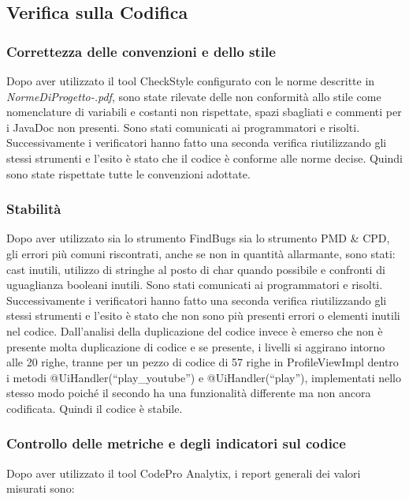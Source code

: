 \subsection{Verifica sulla Codifica}

\subsubsection*{Correttezza delle convenzioni e dello stile}
Dopo aver utilizzato il tool CheckStyle configurato con le norme descritte in
\emph{NormeDiProgetto-\versionenormeprogetto.pdf}, sono state rilevate delle non
conformit\`a allo stile come nomenclature di variabili e costanti non
rispettate, spazi sbagliati e commenti per i JavaDoc non presenti.
Sono stati comunicati ai programmatori e risolti. Successivamente i verificatori
hanno fatto una seconda verifica riutilizzando gli stessi strumenti e l'esito
\`e stato che il codice \`e conforme alle norme decise. Quindi sono state
rispettate tutte le convenzioni adottate.

\subsubsection*{Stabilit\`a}
Dopo aver utilizzato sia lo strumento FindBugs sia lo strumento PMD \& CPD, gli
errori pi\`u comuni riscontrati, anche se non in quantit\`a allarmante, sono
stati: cast inutili, utilizzo di stringhe al posto di char quando possibile
e confronti di uguaglianza booleani inutili. Sono stati
comunicati ai programmatori e risolti. Successivamente i verificatori hanno
fatto una seconda verifica riutilizzando gli stessi strumenti e l'esito \`e
stato che non sono pi\`u presenti errori o elementi inutili nel codice. 
Dall'analisi della duplicazione del
codice invece \`e emerso che non \`e presente molta duplicazione di codice e se
presente, i livelli si aggirano intorno alle 20 righe, tranne per un pezzo di
codice di 57 righe in ProfileViewImpl dentro i metodi @UiHandler(``play\_youtube'') e
@UiHandler(``play''), implementati nello stesso modo poich\'e il
secondo ha una funzionalit\`a differente ma non ancora codificata. Quindi
il codice \`e stabile.

\subsubsection*{Controllo delle metriche e degli indicatori sul codice}
Dopo aver utilizzato il tool CodePro Analytix, i report generali dei valori
misurati sono:

